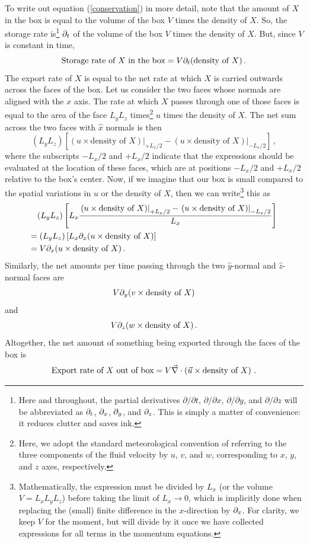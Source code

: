 \documentclass[12pt]{article}
\begin{document}
To write out equation (\ref{conservation}) in more detail, note that the amount of $X$ in the box is equal to the volume of the box $V$ times the density of $X$.  So, the storage rate is\footnote{Here and throughout, the partial derivatives $\partial/\partial t$, $\partial/\partial x$, $\partial/\partial y$, and $\partial/\partial z$ will be abbreviated as $\partial_t$, $\partial_x$, $\partial_y$, and $\partial_z$.  This is simply a matter of convenience: it reduces clutter and saves ink.} $\partial_t$ of the volume of the box $V$ times the density of $X$.  But, since $V$ is constant in time,
\[
\text{Storage rate of $X$ in the box} = V \partial_t (\text{density of $X$}) \, .
\]
The export rate of $X$ is equal to the net rate at which $X$ is carried outwards across the faces of the box.  Let us consider the two faces whose normals are aligned with the $x$ axis. The rate at which $X$ passes through one of those faces is equal to the area of the face $L_y L_z$ times\footnote{Here, we adopt the standard meteorological convention of referring to the three components of the fluid velocity by $u$, $v$, and $w$, corresponding to $x$, $y$, and $z$ axes, respectively.} $u$ times the density of $X$.  The net sum across the two faces with $\hat{x}$ normals is then
\[
(L_y L_z) \left[ \left.(u \times\text{density of $X$})\right|_{+L_x/2} - \left.(u\times\text{density of $X$})\right|_{-L_x/2} \right] \, ,
\]
where the subscripts $-L_x/2$ and $+L_x/2$ indicate that the expressions should be evaluated at the location of these faces, which are at positions $-L_x/2$ and $+L_x/2$ relative to the box's center.  Now, if we imagine that our box is small compared to the spatial variations in $u$ or the density of $X$, then we can write\footnote{Mathematically, the expression must be divided by $L_x$ (or the volume $V=L_x L_y L_z$) before taking the limit of $L_x \rightarrow 0$, which is implicitly done when replacing the (small) finite difference in the $x$-direction by $\partial_x$. For clarity, we keep $V$ for the moment, but will divide by it once we have collected expressions for all terms in the momentum equations.} this as
\begin{align}
& (L_y L_z) \left[ L_x \frac{\left.(u\times\text{density of $X$})\right|_{+L_x/2} - \left.(u\times\text{density of $X$})\right|_{-L_x/2}}{L_x} \right] \\
=& \; (L_y L_z) \left[ L_x \partial_x (u\times\text{density of $X$}) \right] \\
=& \; V \partial_x (u\times\text{density of $X$}) \, .
\end{align}
Similarly, the net amounts per time passing through the two $\hat{y}$-normal and $\hat{z}$-normal faces are
\[
V \partial_y (v\times\text{density of $X$})
\]
and
\[
V \partial_z (w\times\text{density of $X$}) \, .
\]
Altogether, the net amount of something being exported through the faces of the box is
\[
\text{Export rate of $X$ out of box} = V {\vec{\nabla}} \cdot \left(\vec{u} \times \text{density of $X$} \right) \, .
\]
\end{document}
